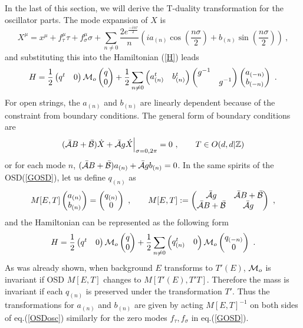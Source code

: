 \documentclass[a4paper,12pt]{article}
\newcommand{\Z}{{\mathbb{Z}}}
\newcommand{\bp}{\begin{pmatrix}}
\newcommand{\ep}{\end{pmatrix}}
\newcommand{\no}{\nonumber}
\def \cAb{{\bar {\cal A}}}
\def \cBb{{\bar {\cal B}}}
\def \Xd{{\dot X}}
\def \Xa{{\acute X}}
\def \half{\frac{1}{2}}
\def \cM{{\cal M}}
\begin{document}
In the last of this section, we will derive the T-duality transformation 
for the oscillator parts. The mode expansion of $X$ is 
\begin{equation*}
 X^\mu=x^\mu+f_\tau^\mu\tau+f_\sigma^\mu\sigma+\sum_{n\ne 0}
 \frac{2 e^{\frac{-i n\tau}{2}}}{n}
 (i a_{(n)}\cos(\frac{n\sigma}{2})+b_{(n)}\sin(\frac{n\sigma}{2}))\ , 
\end{equation*}
and substituting this into the Hamiltonian (\ref{H}) leads 
\begin{equation}
 H=\half \bp q^t&0\ep\cM_o \bp q\\ 0 \ep+\half\sum_{n\ne 0}
 \bp a^t_{(n)}&b^t_{(n)}\ep \bp g^{-1}& \\ &g^{-1}\ep 
 \bp a_{(-n)}\\b_{(-n)}\ep\ . \no 
\end{equation}
For open strings, the $a_{(n)}$ and $b_{(n)}$ are linearly dependent 
because of the constraint from boundary conditions. 
The general form of boundary conditions are 
\begin{equation*}
 (\cAb B+\cBb)\Xd+\cAb g\Xa \Big|_{\sigma=0,2\pi}=0\ ,\qquad 
 T\in O(d,d |\Z) 
\end{equation*}
or for each mode $n$, $(\cAb B+\cBb)a_{(n)}+\cAb g b_{(n)}= 0$. In the 
same spirits of the OSD(\ref{GOSD}), let us define $q_{(n)}$ as 
\begin{equation}
 M[E,T]\bp a_{(n)}\\ b_{(n)}\ep= \bp q_{(n)}\\  0\ep\ ,\qquad  
 M[E,T]:=\bp \cAb g& \cAb B + \cBb\\ \cAb B + \cBb&\cAb g \ep\ ,
 \label{OSDosc}
\end{equation}
and the Hamiltonian can be represented as the following form
\begin{equation}
 H=\half \bp q^t&0\ep\cM_o \bp q\\ 0 \ep+\half\sum_{n\ne 0}
 \bp q^t_{(n)}&  0\ep \cM_o
 \bp q_{(-n)}\\  0\ep\ . \no  
\end{equation}
As was already shown, when background $E$ transforms to $T'(E)$, 
$\cM_o$ is invariant if OSD $M[E,T]$ changes to $M[T'(E),T'T]$.
Therefore the mass is invariant if each $q_{(n)}$ is preserved under 
the transformation $T'$. Thus the transformations 
for $a_{(n)}$ and $b_{(n)}$ are given by 
acting $M[E, T]^{-1}$ on both sides of eq.(\ref{OSDosc}) similarly for the 
zero modes $f_\tau, f_\sigma$ in eq.(\ref{GOSD}). 
 
\end{document}
